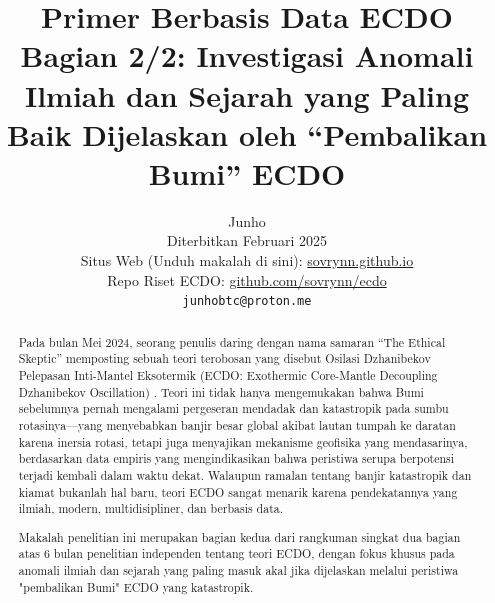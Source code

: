 \documentclass[10pt,twocolumn,letterpaper]{article}
\begin{document}
\title{Primer Berbasis Data ECDO Bagian 2/2: Investigasi Anomali Ilmiah dan Sejarah yang Paling Baik Dijelaskan oleh “Pembalikan Bumi” ECDO}

\author{Junho\\
Diterbitkan Februari 2025\\
Situs Web (Unduh makalah di sini): \href{https://sovrynn.github.io}{sovrynn.github.io}\\
Repo Riset ECDO: \href{https://github.com/sovrynn/ecdo}{github.com/sovrynn/ecdo}\\
{\tt\small junhobtc@proton.me}
}

\maketitle

\begin{abstract}
Pada bulan Mei 2024, seorang penulis daring dengan nama samaran “The Ethical Skeptic” \cite{0} memposting sebuah teori terobosan yang disebut Osilasi Dzhanibekov Pelepasan Inti-Mantel Eksotermik (ECDO: Exothermic Core-Mantle Decoupling Dzhanibekov Oscillation) \cite{1}. Teori ini tidak hanya mengemukakan bahwa Bumi sebelumnya pernah mengalami pergeseran mendadak dan katastropik pada sumbu rotasinya—yang menyebabkan banjir besar global akibat lautan tumpah ke daratan karena inersia rotasi, tetapi juga menyajikan mekanisme geofisika yang mendasarinya, berdasarkan data empiris yang mengindikasikan bahwa peristiwa serupa berpotensi terjadi kembali dalam waktu dekat. Walaupun ramalan tentang banjir katastropik dan kiamat bukanlah hal baru, teori ECDO sangat menarik karena pendekatannya yang ilmiah, modern, multidisipliner, dan berbasis data.

Makalah penelitian ini merupakan bagian kedua dari rangkuman singkat dua bagian atas 6 bulan penelitian independen \cite{2,20} tentang teori ECDO, dengan fokus khusus pada anomali ilmiah dan sejarah yang paling masuk akal jika dijelaskan melalui peristiwa "pembalikan Bumi" ECDO yang katastropik.
\end{abstract}
\end{document}
